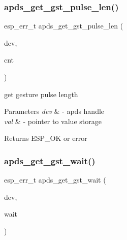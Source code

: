 \subsubsection{\texorpdfstring{apds\+\_\+get\+\_\+gst\+\_\+pulse\+\_\+len()}{apds\_get\_gst\_pulse\_len()}}
{\footnotesize\ttfamily esp\+\_\+err\+\_\+t apds\+\_\+get\+\_\+gst\+\_\+pulse\+\_\+len (\begin{DoxyParamCaption}\item[{\hyperlink{structAPDS9960__Driver}{A\+P\+D\+S\+\_\+\+D\+EV}}]{dev,  }\item[{\hyperlink{vl53l0x__types_8h_aba7bc1797add20fe3efdf37ced1182c5}{uint8\+\_\+t} $\ast$}]{cnt }\end{DoxyParamCaption})}




\begin{DoxyItemize}
\item get gesture pulse length 
\end{DoxyItemize}


\begin{DoxyParams}{Parameters}
{\em dev} & -\/ apds handle \\
\hline
{\em val} & -\/ pointer to value storage \\
\hline
\end{DoxyParams}
\begin{DoxyReturn}{Returns}
E\+S\+P\+\_\+\+OK or error 
\end{DoxyReturn}
\mbox{\label{group__APDS9960__GestureFunctions_ga7276489ee5a7a166406301104a53251a}} 
\subsubsection{\texorpdfstring{apds\+\_\+get\+\_\+gst\+\_\+wait()}{apds\_get\_gst\_wait()}}
{\footnotesize\ttfamily esp\+\_\+err\+\_\+t apds\+\_\+get\+\_\+gst\+\_\+wait (\begin{DoxyParamCaption}\item[{\hyperlink{structAPDS9960__Driver}{A\+P\+D\+S\+\_\+\+D\+EV}}]{dev,  }\item[{\hyperlink{vl53l0x__types_8h_aba7bc1797add20fe3efdf37ced1182c5}{uint8\+\_\+t} $\ast$}]{wait }\end{DoxyParamCaption})}





